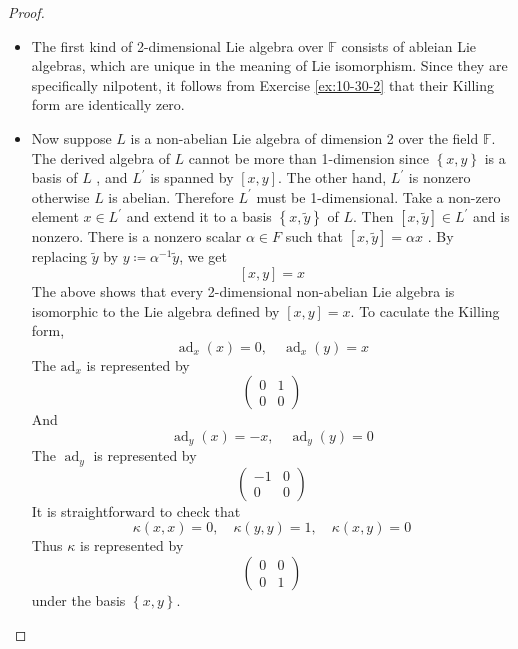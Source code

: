 \documentclass[../main.tex]{subfiles}
\begin{document}
\begin{proof}
\begin{itemize}
    \item The first kind of 2-dimensional Lie algebra over \(  \mathbb{F}  \) consists of ableian Lie algebras, which are unique in the meaning of  Lie isomorphism. Since they are specifically nilpotent, it follows from Exercise \ref{ex:10-30-2} that their Killing form are identically zero.
    \item Now suppose \(  L  \) is a non-abelian Lie algebra of dimension 2 over the field \(  \mathbb{F}  \).  The derived algebra of \(  L  \)  cannot be more than 1-dimension since \(  \left\{ x,y \right\}  \) is a basis of \(  L  \) , and \(  L^{\prime}   \) is spanned by \(  \left[ x,y \right]   \). The other hand, \(  L^{\prime}   \) is nonzero otherwise \(  L  \) is abelian.      Therefore \(  L^{\prime}   \) must be 1-dimensional. Take a non-zero element \(  x \in L^{\prime}   \) and extend it to a basis \(  \left\{ x, \tilde{y} \right\}  \) of \(  L  \). Then \(  \left[ x, \tilde{y} \right]\in L^{\prime}    \) and is nonzero. There is a nonzero scalar \(  \alpha \in F  \) such that \(  \left[ x, \tilde{y} \right]= \alpha x   \)     . By replacing \(  \tilde{y}  \) by \(  y\coloneqq \alpha ^{-1} \tilde{y}  \), we get \[
    \left[ x,y \right]= x 
    \]  
    The above shows that every 2-dimensional non-abelian Lie algebra is isomorphic to the Lie algebra defined by \(  \left[ x,y \right]= x   \).  To caculate the Killing form, \[
    \operatorname{ad}_{x}\left( x \right)= 0, \quad \operatorname{ad}_{x}\left( y \right)= x  
    \] The \(  \mathrm{ad}_{x}  \) is represented by \[
    \begin{pmatrix} 
        0&1\\ 
         0&0 
    \end{pmatrix} 
    \] And \[
    \operatorname{ad}_{y}\left( x \right)= -x,\quad \operatorname{ad}_{y}\left( y \right)= 0  
    \]The \(  \operatorname{ad}_{y}  \) is represented by \[
    \begin{pmatrix} 
        -1&0\\ 
         0&0 
    \end{pmatrix} 
    \]  It is straightforward to check that \[
     \kappa \left( x,x\right)= 0,\quad  \kappa \left( y,y \right)= 1,\quad  \kappa \left( x,y \right)= 0   
    \]Thus \(   \kappa   \) is represented by \[
    \begin{pmatrix} 
        0&0\\ 
         0&1 
    \end{pmatrix} 
    \] under the basis \(  \left\{ x,y \right\}  \).  
\end{itemize}

\end{proof}
\end{document}
